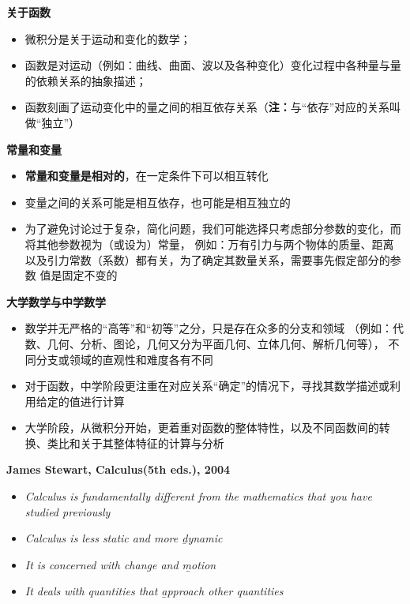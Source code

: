 	\begin{shaded}
		{\bf 关于函数}
		\begin{itemize}
  		  \setlength{\itemindent}{1cm}
		  \item 微积分是关于运动和变化的数学；
		  \item 函数是对运动（例如：曲线、曲面、波以及各种变化）变化过程中各种量与量的依赖关系的抽象描述；
		  \item 函数刻画了运动变化中的量之间的相互依存关系（{\bf 注：}与“依存”对应的关系叫做“独立”）
		\end{itemize}
		
		{\bf 常量和变量}
		\begin{itemize}
  		  \setlength{\itemindent}{1cm}
		  \item {\bf 常量和变量是相对的}，在一定条件下可以相互转化
		  \item 变量之间的关系可能是相互依存，也可能是相互独立的
		  \item 为了避免讨论过于复杂，简化问题，我们可能选择只考虑部分参数的变化，而将其他参数视为（或设为）常量，
		  例如：万有引力与两个物体的质量、距离以及引力常数（系数）都有关，为了确定其数量关系，需要事先假定部分的参数
		  值是固定不变的
		\end{itemize}
		
		{\bf 大学数学与中学数学}
		\begin{itemize}
  		  \setlength{\itemindent}{1cm}
		  \item 数学并无严格的“高等”和“初等”之分，只是存在众多的分支和领域
		  （例如：代数、几何、分析、图论，几何又分为平面几何、立体几何、解析几何等），
		  不同分支或领域的直观性和难度各有不同
		  \item 对于函数，中学阶段更注重在对应关系“确定”的情况下，寻找其数学描述或利用给定的值进行计算
		  \item 大学阶段，从微积分开始，更着重对函数的整体特性，以及不同函数间的转换、类比和关于其整体特征的计算与分析
		\end{itemize}
		
		 {\bf James Stewart, Calculus(5th eds.), 2004}
		  \begin{itemize}
  		    \setlength{\itemindent}{1cm}
		    \item {\it Calculus is fundamentally different from the mathematics that
		    you have studied previously}
		    \item {\it Calculus is less static and more {\b dynamic}}
		    \item {\it It is concerned with change and {\b motion}}
		    \item {\it It deals with quantities that {\b approach} other
		    quantities}%
		  \end{itemize}
	\end{shaded}

